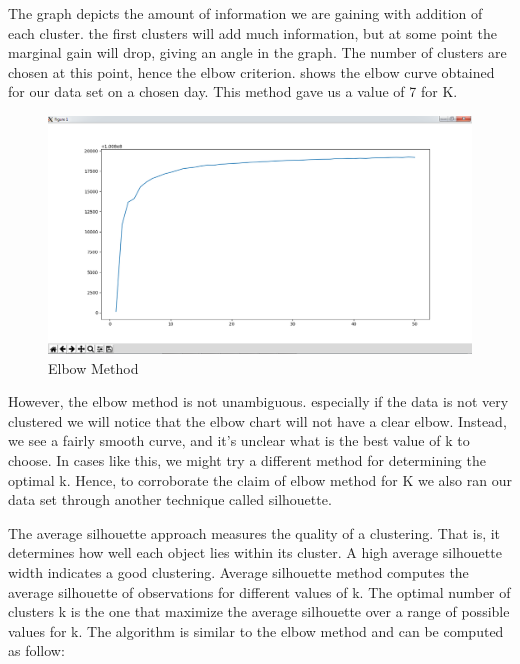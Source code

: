  	The graph depicts the amount of information we are gaining with addition of each cluster. the first clusters will add much information, but at some point the marginal gain will drop, giving an angle in the graph. The number of clusters are chosen at this point, hence the elbow criterion.  shows the elbow curve obtained for our data set on a chosen day. This method gave us a value of 7 for K.
 	

\begin{figure}[ht]
	\centerline{\includegraphics[scale = 0.4]{elbow.png}}
	\caption{Elbow Method}%
\end{figure}

 However, the elbow method is not unambiguous. especially if the data is not very clustered we will notice that the elbow chart will not have a clear elbow. Instead, we see a fairly smooth curve, and it's unclear what is the best value of k to choose. In cases like this, we might try a different method for determining the optimal k. Hence, to corroborate the claim of elbow method for K we also ran our data set through another technique called silhouette.

	The average silhouette approach measures the quality of a clustering. That is, it determines how well each object lies within its cluster. A high average silhouette width indicates a good clustering.	Average silhouette method computes the average silhouette of observations for different values of k. The optimal number of clusters k is the one that maximize the average silhouette over a range of possible values for k.	The algorithm is similar to the elbow method and can be computed as follow: 
	
